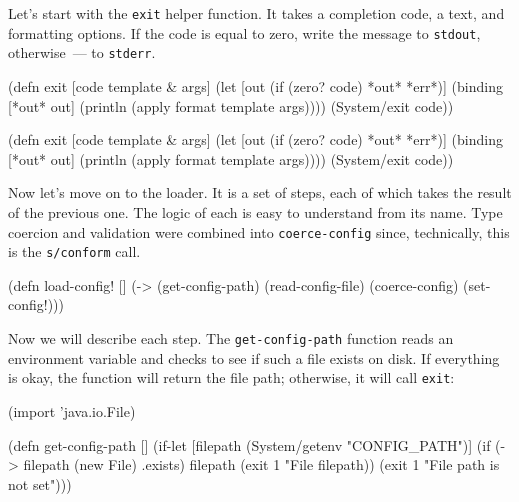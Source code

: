 Let's start with the \verb|exit| helper function. It takes a completion code, a text, and formatting options. If the code is equal to zero, write the message to \verb|stdout|, otherwise~--- to \verb|stderr|.


\ifx\DEVICETYPE\MOBILE

\begin{english}
  \begin{clojure}
(defn exit
  [code template & args]
  (let [out (if (zero? code)
              *out*
              *err*)]
    (binding [*out* out]
      (println (apply format
        template args))))
  (System/exit code))
  \end{clojure}
\end{english}

\else

\begin{english}
  \begin{clojure}
(defn exit
  [code template & args]
  (let [out (if (zero? code) *out* *err*)]
    (binding [*out* out]
      (println (apply format template args))))
  (System/exit code))
  \end{clojure}
\end{english}

\fi

Now let's move on to the loader. It is a set of steps, each of which takes the result of the previous one. The logic of each is easy to understand from its name. Type coercion and validation were combined into \verb|coerce-config| since, technically, this is the \verb|s/conform| call.


\begin{english}
  \begin{clojure}
(defn load-config! []
  (-> (get-config-path)
      (read-config-file)
      (coerce-config)
      (set-config!)))
  \end{clojure}
\end{english}

Now we will describe each step. The \verb|get-config-path| function reads an environment variable and checks to see if such a file exists on disk. If everything is okay, the function will return the file path; otherwise, it will call \verb|exit|:


\ifx\DEVICETYPE\MOBILE

\begin{english}
  \begin{clojure}
(import 'java.io.File)

(defn get-config-path []
  (if-let [filepath (System/getenv
                      "CONFIG_PATH")]
    (if (-> filepath (new File) .exists)
      filepath
      (exit 1 "File %
        filepath))
    (exit 1 "File path is not set")))
  \end{clojure}
\end{english}

